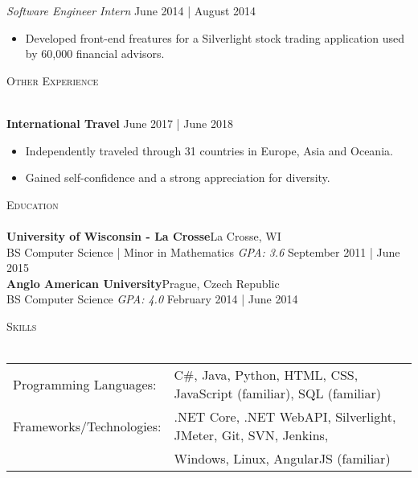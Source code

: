 \documentclass[a4paper]{article}
\newcommand{\lineunder} {
    \vspace*{-8pt} \\
    \hspace*{-18pt} \hrulefill \\
}
\newcommand{\header} [1] {
    {\hspace*{-18pt}\vspace*{6pt} \textsc{#1}}
    \vspace*{-6pt} \lineunder
}
\begin{document}
\vspace{-1mm}
\textit{Software Engineer Intern} \hfill June 2014 | August 2014\\
\vspace{-1mm}
\begin{itemize} \itemsep 1pt
	\item Developed front-end freatures for a Silverlight stock trading application used by 60,000 financial advisors.
\end{itemize}

\header{Other Experience}
\vspace{1mm}

\textbf{International Travel} \hfill June 2017 | June 2018\\
\vspace{-1mm}
\begin{itemize} \itemsep 1pt
	\item Independently traveled through 31 countries in Europe, Asia and Oceania.
	\item Gained self-confidence and a strong appreciation for diversity.
\end{itemize}

\header{Education}
\textbf{University of Wisconsin - La Crosse}\hfill La Crosse, WI\\
BS Computer Science | Minor in Mathematics \textit{GPA: 3.6} \hfill September 2011 | June 2015\\
\vspace{2mm}
\textbf{Anglo American University}\hfill Prague, Czech Republic\\
BS Computer Science \textit{GPA: 4.0} \hfill February 2014 | June 2014\\
\vspace{2mm}

\header{Skills}
\begin{tabular}{ l l }
	Programming Languages: & C\#, Java, Python, HTML, CSS, JavaScript (familiar), SQL (familiar)               \\
	Frameworks/Technologies:            & .NET Core, .NET WebAPI, Silverlight, JMeter, Git, SVN, Jenkins, \\
	& Windows, Linux, AngularJS (familiar) \\ 
\end{tabular}
\vspace{2mm}







\ 
\end{document}
